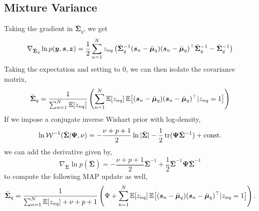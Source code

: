 \documentclass{article}
\newcommand{\source}{s}
\newcommand{\sourcevec}{\bm{\source}}
\newcommand{\obs}{y}
\newcommand{\obsvec}{\bm{\obs}}
\newcommand{\mean}{\mu}
\newcommand{\meanvec}{\bm{\mean}}
\newcommand{\assign}{z}
\newcommand{\assignvec}{\bm{\assign}}
\newcommand{\compmeanvec}{\bar{\meanvec}}
\newcommand{\compcov}{\bar{\bm{\Sigma}}}
\begin{document}
\subsection{Mixture Variance}
Taking the gradient in $\compcov_q$, we get
\begin{equation}
\nabla_{\compcov_q}\ln p(\obsvec,\sourcevec,\assignvec)=\frac{1}{2}\sum_{n=1}^{N}\assign_{nq}\left(\compcov_q^{-1}(\sourcevec_n-\compmeanvec_q)(\sourcevec_n-\compmeanvec_q)\T\compcov_q^{-1}-\compcov^{-1}_q\right)
\end{equation}
Taking the expectation and setting to $0$, we can then isolate the covariance matrix, 
\begin{equation}
\compcov_q=\frac{1}{\sum_{n=1}^{N}\E{\assign_{nq}}}\left(\sum_{n=1}^{N}\E{\assign_{nq}}\E{(\sourcevec_n-\compmeanvec_q)(\sourcevec_n-\compmeanvec_q)\T|\assign_{nq}=1}\right)
\end{equation}
If we impose a conjugate inverse Wishart prior with log-density,
\begin{equation}
\ln \mathcal{W}^{-1}(\compcov|\bm{\Psi},\nu)=-\frac{\nu+p+1}{2}\ln|\compcov|-\frac{1}{2}\trace({\bm{\Psi}\compcov^{-1}})+\const
\end{equation}
we can add the derivative given by,
\begin{equation}
\nabla_{\compcov}\ln p(\compcov)=-\frac{\nu+p+1}{2}\compcov^{-1}+\frac{1}{2}\compcov^{-1}\bm{\Psi}\compcov^{-1}
\end{equation}
to compute the following MAP update as well,
\begin{equation}
\compcov_q=\frac{1}{\sum_{n=1}^{N}\E{\assign_{nq}}+\nu+p+1}\left(\Psi+\sum_{n=1}^{N}\E{\assign_{nq}}\E{(\sourcevec_n-\compmeanvec_q)(\sourcevec_n-\compmeanvec_q)\T|\assign_{nq}=1}\right).
\end{equation}
\end{document}
